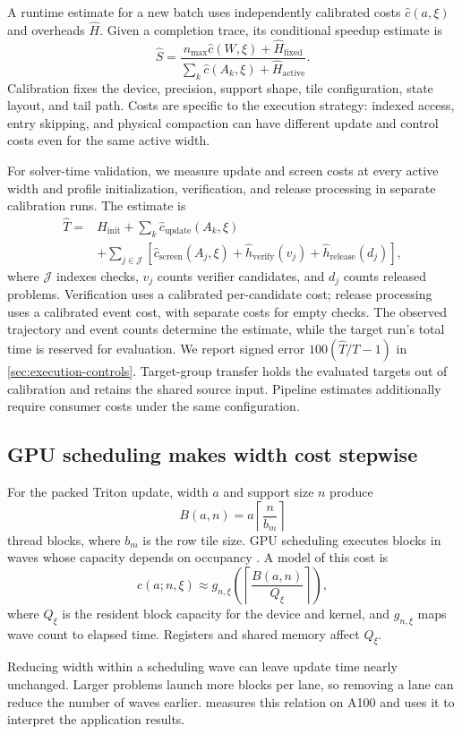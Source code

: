 A runtime estimate for a new batch uses independently calibrated costs $\widehat c(a,\xi)$ and overheads $\widehat H$. Given a completion trace, its conditional speedup estimate is
\begin{equation}
\widehat S=\frac{n_{\max}\widehat c(W,\xi)+\widehat H_{\mathrm{fixed}}}
{\sum_k\widehat c(A_k,\xi)+\widehat H_{\mathrm{active}}}.
\label{eq:conditional-prediction}
\end{equation}
Calibration fixes the device, precision, support shape, tile configuration, state layout, and tail path. Costs are specific to the execution strategy: indexed access, entry skipping, and physical compaction can have different update and control costs even for the same active width.

For solver-time validation, we measure update and screen costs at every active width and profile initialization, verification, and release processing in separate calibration runs. The estimate is
\begin{equation}
\begin{split}
\widehat T={}&\widehat H_{\mathrm{init}}+\sum_k\widehat c_{\mathrm{update}}(A_k,\xi)\\
&+\sum_{j\in\mathcal J}\left[\widehat c_{\mathrm{screen}}(A_j,\xi)
+\widehat h_{\mathrm{verify}}(v_j)
+\widehat h_{\mathrm{release}}(d_j)\right],
\end{split}
\label{eq:calibrated-runtime}
\end{equation}
where $\mathcal J$ indexes checks, $v_j$ counts verifier candidates, and $d_j$ counts released problems. Verification uses a calibrated per-candidate cost; release processing uses a calibrated event cost, with separate costs for empty checks. The observed trajectory and event counts determine the estimate, while the target run's total time is reserved for evaluation. We report signed error $100(\widehat T/T-1)$ in \cref{sec:execution-controls}. Target-group transfer holds the evaluated targets out of calibration and retains the shared source input. Pipeline estimates additionally require consumer costs under the same configuration.

\subsection{GPU scheduling makes width cost stepwise}

For the packed Triton update, width $a$ and support size $n$ produce
\begin{equation}
B(a,n)=a\left\lceil\frac{n}{b_m}\right\rceil
\label{eq:block-grid}
\end{equation}
thread blocks, where $b_m$ is the row tile size. GPU scheduling executes blocks in waves whose capacity depends on occupancy \citep{nvidia2022gpuperformance,nvidia2024cuda}. A model of this cost is
\begin{equation}
c(a;n,\xi)\approx g_{n,\xi}\!\left(
\left\lceil\frac{B(a,n)}{Q_\xi}\right\rceil\right),
\label{eq:wave-cost}
\end{equation}
where $Q_\xi$ is the resident block capacity for the device and kernel, and $g_{n,\xi}$ maps wave count to elapsed time. Registers and shared memory affect $Q_\xi$.

Reducing width within a scheduling wave can leave update time nearly unchanged. Larger problems launch more blocks per lane, so removing a lane can reduce the number of waves earlier.  measures this relation on A100 and uses it to interpret the application results.
